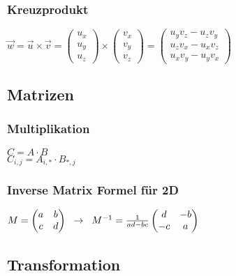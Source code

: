 \documentclass{article}
\begin{document}
\subsubsection*{Kreuzprodukt}
\begin{center}
	$\vec{w} = \vec{u} \times \vec{v} = \begin{pmatrix}u_x\\ u_y\\u_z\end{pmatrix} \times \begin{pmatrix}v_x\\v_y\\v_z\end{pmatrix} = \begin{pmatrix}u_yv_z - u_zv_y\\u_zv_x - u_xv_z\\u_xv_y - u_yv_x\end{pmatrix}$\\
\end{center}

\subsection*{Matrizen}
\subsubsection*{Multiplikation}
\begin{center}
	$C = A \cdot B$ \\
	$C_{i,j} = A_{i,*} \cdot B_{*,j}$\\	
\end{center}
\subsubsection*{Inverse Matrix Formel für 2D}
\begin{center}
	$M= \begin{pmatrix}
	  a & b\\
	  c & d\\
	\end{pmatrix}\hspace{0.2cm} \rightarrow \hspace{0.2cm}
	M^{-1} = \frac{1}{ad - bc}
	\begin{pmatrix}
	  d & -b\\
	  -c & a
	\end{pmatrix}$
  \end{center}
\subsection*{Transformation}
\end{document}
